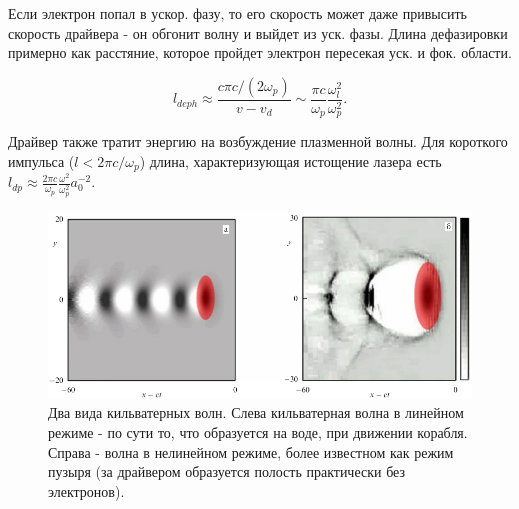 \documentclass[10pt, a4paper]{article}
\begin{document}
Если электрон попал в ускор. фазу, то его скорость может даже привысить скорость драйвера - он обгонит волну и выйдет из
уск. фазы. Длина дефазировки примерно как расстяние, которое пройдет электрон пересекая уск. и фок. области.

\begin{equation}
    l_{deph}\approx \frac{c\pi c/(2\omega_p)}{v - v_d} \sim \frac{\pi c}{\omega_p}\frac{\omega_l^2}{\omega_p^2}.
\end{equation}

Драйвер также тратит энергию на возбуждение плазменной волны. Для короткого импульса ($l < 2\pi c/\omega_p$) длина, 
характеризующая истощение лазера есть $l_{dp}\approx \frac{2\pi c}{\omega_p} \frac{\omega^2}{\omega_p^2}a_0^{-2}$.



\begin{figure}[h!]
	\begin{center}
		\includegraphics[width=0.6\linewidth]{wake-f.png}
	\end{center}
	\caption{Два вида кильватерных волн. Слева кильватерная волна в линейном режиме - по сути то, что образуется на 
    воде, при движении корабля. Справа - волна в нелинейном режиме, более известном как режим пузыря (за драйвером
    образуется полость практически без электронов).}
	\label{fig:scattering}
\end{figure}


\newpage
{}


\end{document}
